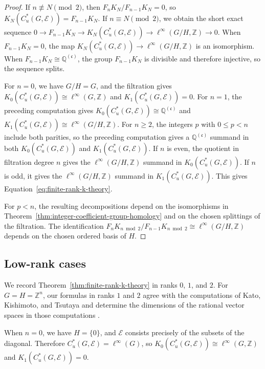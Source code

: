 \documentclass[pdflatex,sn-mathphys-num]{sn-jnl}%
\theoremstyle{plain}
\theoremstyle{remark}
\theoremstyle{definition}
\numberwithin{equation}{section}
\begin{document}
\begin{proof}
If \( n\not\equiv N\pmod 2 \), then \( F_nK_N/F_{n-1}K_N=0 \), so \( K_N(C_u^*(G,\mathcal E))=F_{n-1}K_N \). If \( n\equiv N\pmod 2 \), we obtain the short exact sequence \( 0\to F_{n-1}K_N\to K_N(C_u^*(G,\mathcal E))\to\ell^\infty(G/H,\mathbb Z)\to0 \). When \( F_{n-1}K_N=0 \), the map \( K_N(C_u^*(G,\mathcal E))\to\ell^\infty(G/H,\mathbb Z) \) is an isomorphism. When \( F_{n-1}K_N\cong\mathbb Q^{(\mathfrak c)} \), the group \( F_{n-1}K_N \) is divisible and therefore injective, so the sequence splits.

For \( n=0 \), we have \( G/H=G \), and the filtration gives \( K_0(C_u^*(G,\mathcal E))\cong\ell^\infty(G,\mathbb Z) \) and \( K_1(C_u^*(G,\mathcal E))=0 \). For \( n=1 \), the preceding computation gives \( K_0(C_u^*(G,\mathcal E))\cong\mathbb Q^{(\mathfrak c)} \) and \( K_1(C_u^*(G,\mathcal E))\cong\ell^\infty(G/H,\mathbb Z) \). For \( n\geq2 \), the integers \( p \) with \( 0\leq p<n \) include both parities, so the preceding computation gives a \( \mathbb Q^{(\mathfrak c)} \) summand in both \( K_0(C_u^*(G,\mathcal E)) \) and \( K_1(C_u^*(G,\mathcal E)) \). If \( n \) is even, the quotient in filtration degree \( n \) gives the \( \ell^\infty(G/H,\mathbb Z) \) summand in \( K_0(C_u^*(G,\mathcal E)) \). If \( n \) is odd, it gives the \( \ell^\infty(G/H,\mathbb Z) \) summand in \( K_1(C_u^*(G,\mathcal E)) \). This gives Equation~\eqref{eq:finite-rank-k-theory}.

For \( p<n \), the resulting decompositions depend on the isomorphisms in Theorem~\ref{thm:integer-coefficient-group-homology} and on the chosen splittings of the filtration. The identification \( F_nK_{n\bmod 2}/F_{n-1}K_{n\bmod 2}\cong\ell^\infty(G/H,\mathbb Z) \) depends on the chosen ordered basis of \( H \).
\end{proof}

\subsection{Low-rank cases}

We record Theorem~\ref{thm:finite-rank-k-theory} in ranks \( 0 \), \( 1 \), and \( 2 \). For \( G=H=\mathbb Z^n \), our formulas in ranks \( 1 \) and \( 2 \) agree with the computations of Kato, Kishimoto, and Tsutaya and determine the dimensions of the rational vector spaces in those computations \cite{Kato_2021}.

When \( n=0 \), we have \( H=\{0\} \), and \( \mathcal E \) consists precisely of the subsets of the diagonal. Therefore \( C_u^*(G,\mathcal E)=\ell^\infty(G) \), so \( K_0(C_u^*(G,\mathcal E))\cong\ell^\infty(G,\mathbb Z) \) and \( K_1(C_u^*(G,\mathcal E))=0 \).
\end{document}
